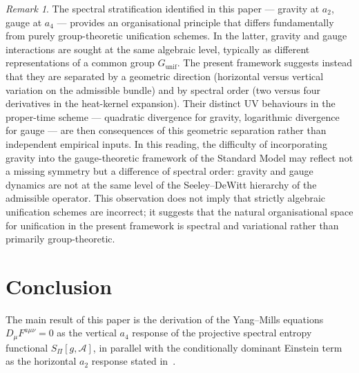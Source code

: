 \documentclass[12pt,a4paper]{article}
\theoremstyle{remark}
\newtheorem*{remark}{Remark}
\theoremstyle{plain}
\theoremstyle{definition}
\begin{document}
      \begin{remark}
        The spectral stratification identified in this paper ---
        gravity at $a_2$, gauge at $a_4$ --- provides an
        organisational principle that differs fundamentally from
        purely group-theoretic unification schemes.
        In the latter, gravity and gauge interactions are sought
        at the same algebraic level, typically as different
        representations of a common group $G_{\mathrm{unif}}$.
        The present framework suggests instead that they are
        separated by a geometric direction (horizontal versus
        vertical variation on the admissible bundle) and by
        spectral order (two versus four derivatives in the
        heat-kernel expansion).
        Their distinct UV behaviours in the proper-time scheme --- quadratic divergence
        for gravity, logarithmic divergence for gauge --- are
        then consequences of this geometric separation rather
        than independent empirical inputs.
        In this reading, the difficulty of incorporating gravity
        into the gauge-theoretic framework of the Standard Model
        may reflect not a missing symmetry but a difference of
        spectral order: gravity and gauge dynamics are
        not at the same level of the Seeley--DeWitt hierarchy
        of the admissible operator.
        This observation does not imply that strictly algebraic
        unification schemes are incorrect; it suggests that the
        natural organisational space for unification in the
        present framework is spectral and variational rather
        than primarily group-theoretic.
      \end{remark}

  \section{Conclusion}
    \label{sec:conclusion}

    The main result of this paper is the derivation of the
    Yang--Mills equations $D_\mu F^{a\mu\nu} = 0$ as the vertical
    $a_4$ response of the projective spectral entropy functional
    $S_\Pi[g, \mathcal{A}]$, in parallel with the
    conditionally dominant Einstein term as the horizontal $a_2$ response
    stated in~\cite{Beau2026h}.
\end{document}
